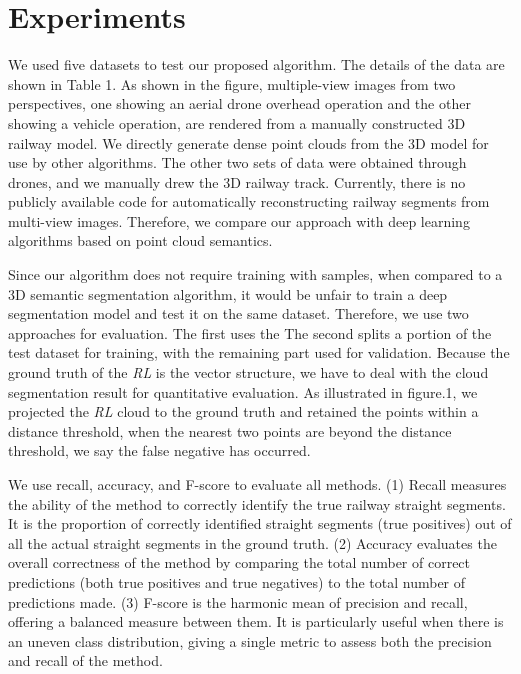 \section{Experiments}
We used five datasets to test our proposed algorithm.
The details of the data are shown in Table 1.
As shown in the figure, 
multiple-view images from two perspectives, 
one showing an aerial drone overhead operation and the other showing a vehicle operation, 
are rendered from a manually constructed 3D railway model.
We directly generate dense point clouds from the 3D model for use by other algorithms.
The other two sets of data were obtained through drones, 
and we manually drew the 3D railway track.
Currently, 
there is no publicly available code for automatically reconstructing railway segments from multi-view images. Therefore, 
we compare our approach with deep learning algorithms based on point cloud semantics.

Since our algorithm does not require training with samples,  
when compared to a 3D semantic segmentation algorithm,
it would be unfair to train a deep segmentation model and test it on the same dataset. 
Therefore, 
we use two approaches for evaluation. 
The first uses the  
The second splits a portion of the test dataset for training, 
with the remaining part used for validation.
Because the ground truth of the \textit{RL} is the vector structure,
we have to deal with the cloud segmentation result for quantitative evaluation.
As illustrated in figure.1, 
we projected the \textit{RL} cloud to the ground truth and retained the points within a distance threshold,
when the nearest two points are beyond the distance threshold, 
we say the false negative has occurred.


We use recall, accuracy, and F-score to evaluate all methods.
(1) Recall measures the ability of the method to correctly identify the true railway straight segments. 
It is the proportion of correctly identified straight segments (true positives) out of all the actual straight segments in the ground truth.
(2) Accuracy evaluates the overall correctness of the method by comparing the total number of correct predictions (both true positives and true negatives) to the total number of predictions made.
(3) F-score is the harmonic mean of precision and recall, offering a balanced measure between them. It is particularly useful when there is an uneven class distribution, giving a single metric to assess both the precision and recall of the method.




